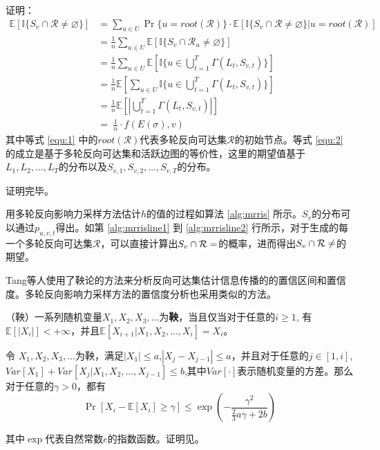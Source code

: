 \noindent 证明：
\begin{align}
    \mathbb{E}[\mathbb{I}\{S_v\cap \mathcal{R} \ne \varnothing  \}] &=\sum_{u \in U}\Pr\{ u=root(\mathcal{R})\}\cdot \mathbb{E}[\mathbb{I}\{S_v \cap \mathcal{R}\ne\varnothing \}|u=root(\mathcal{R})] \label{equ:1} \\ 
    &= \frac{1}{n}\sum_{u \in U}\mathbb{E}[\mathbb{I}\{S_v \cap \mathcal{R}_u \ne \varnothing \}] \\ 
    &=  \frac{1}{n}\sum_{u \in U}\mathbb{E}\left[\mathbb{I}\{u\in \bigcup_{t=1}^{T}\Gamma(L_t,S_{v,t})\}\right]  \label{equ:2}\\ 
    &= \frac{1}{n} \mathbb{E}\left[\sum_{u \in U}\mathbb{I}\{u\in \bigcup_{t=1}^{T}\Gamma(L_t,S_{v,t})\}\right] \\ 
    &= \frac{1}{n}\mathbb{E}\left[\left|\bigcup_{t=1}^T\Gamma(L_t,S_{v,t})\right|\right] \\ 
    &=\ \frac{1}{n}\cdot f(E(\sigma),v)    
\end{align}
其中等式 \ref{equ:1} 中的$root(\mathcal{R})$代表多轮反向可达集$\mathcal{R}$的初始节点。等式 \ref{equ:2} 的成立是基于多轮反向可达集和活跃边图的等价性，这里的期望值基于$L_1,L_2,\ldots, L_T$的分布以及$S_{v,1},S_{v,2},\ldots,S_{v,T}$的分布。

\noindent 证明完毕。

用多轮反向影响力采样方法估计$h$的值的过程如算法 \ref{alg:mrris} 所示。$S_v$的分布可以通过$p_{u,v,t}$得出。如第 \ref{alg:mrrisline1} 到 \ref{alg:mrrisline2} 行所示，对于生成的每一个多轮反向可达集$\mathcal{R}$，可以直接计算出$S_v \cap \mathcal{R} = \empty$的概率，进而得出$S_v \cap \mathcal{R} \neq \empty$的期望。

Tang等人\cite{IMM}使用了鞅论的方法来分析反向可达集估计信息传播的的置信区间和置信度。多轮反向影响力采样方法的置信度分析也采用类似的方法。

\begin{definition}
\label{def:marginal}
（鞅）一系列随机变量$X_1,X_2,X_3,\ldots$为{\bfseries 鞅}，当且仅当对于任意的$i\ge1$, 有$\mathbb{E}[|X_i|]<+\infty$，并且$\mathbb{E}[X_{i+1}|X_1,X_2,\ldots,X_i]=X_i$。
\end{definition}

\begin{lemma}
\label{lem:mar}
令 $X_1,X_2,X_3,\ldots$为鞅，满足$|X_1|\le a$,$|X_j-X_{j-1}|\le a$，并且对于任意的$j\in[1,i]$,$Var[X_1]+Var[X_j|X_1,X_2,\ldots,X_{j-1}]\le b$,其中$Var[\cdot]$表示随机变量的方差。那么对于任意的$\gamma > 0$，都有
\begin{equation}
\Pr\left[X_i-\mathbb{E}[X_i] \ge \gamma\right]\le \exp\left(-\frac{\gamma^2}{\frac{2}{3}a\gamma +2b}\right)
\end{equation}
\end{lemma}
其中$\exp$代表自然常数$e$的指数函数。证明见\parencite{chung2006concentration}。


